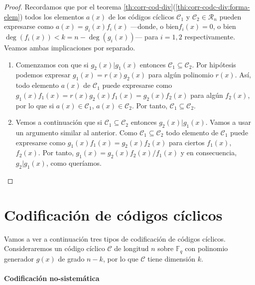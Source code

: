 \begin{proof}
  Recordamos que por el teorema \ref{th:corr-cod-div}(\ref{thi:corr-codc-div:forma-elem}) todos los elementos \(a(x)\) de los códigos cíclicos \(\mathcal C_1\) y \(\mathcal C_2 \in \mathcal R_n\) pueden expresarse como \(a(x) = g_i(x)f_i(x)\) —donde, o bien\(f_i(x) = 0\), o bien \(\deg(f_i(x)) < k = n - \deg(g_i(x))\)— para \(i = 1, 2\) respectivamente.
  Veamos ambas implicaciones por separado.
  \begin{enumerate}
    \item Comenzamos con que si \(g_2(x) | g_1(x)\) entonces \(\mathcal C_1 \subseteq \mathcal C_2\).
    Por hipótesis podemos expresar \(g_1(x) = r(x)g_2(x)\) para algún polinomio \(r(x)\).
    Así, todo elemento \(a(x)\) de \(\mathcal C_1\) puede expresarse como \(g_1(x)f_1(x) = r(x)g_2(x)f_1(x) = g_2(x)f_2(x)\) para algún \(f_2(x)\), por lo que si \(a(x) \in \mathcal C_1\), \(a(x) \in \mathcal C_2\).
    Por tanto, \(\mathcal C_1 \subseteq \mathcal C_2\).
    \item Vemos a continuación que si \(\mathcal C_1 \subseteq \mathcal C_2\) entonces \(g_2(x) | g_1(x)\).
    Vamos a usar un argumento similar al anterior.
    Como \(\mathcal C_1 \subseteq \mathcal C_2\) todo elemento de \(\mathcal C_1\) puede expresarse como \(g_1(x)f_1(x) = g_2(x)f_2(x)\) para ciertos \(f_1(x)\), \(f_2(x)\).
    Por tanto, \(g_1(x) = g_2(x)f_2(x)/f_1(x)\) y en consecuencia, \(g_2 | g_1(x)\), como queríamos.\qedhere
  \end{enumerate}
\end{proof}


\section{Codificación de códigos cíclicos}

Vamos a ver a continuación tres tipos de codificación de códigos cíclicos.
Consideraremos un código cíclico \(\mathcal C\) de longitud \(n\) sobre \(\mathbb F_q\) con polinomio generador \(g(x)\) de grado \(n - k\), por lo que \(\mathcal C\) tiene dimensión \(k\).

\paragraph{Codificación no-sistemática}


